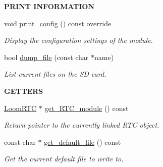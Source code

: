 \begin{Indent}{\bf P\+R\+I\+NT I\+N\+F\+O\+R\+M\+A\+T\+I\+ON}\par
\begin{DoxyCompactItemize}
\item 
void \hyperlink{class_loom___s_d_a4c0c3f46a3479ed8e4a96c0ca4acfa7e}{print\+\_\+config} () const override
\begin{DoxyCompactList}\small\item\em Display the configuration settings of the module. \end{DoxyCompactList}\item 
bool \hyperlink{class_loom___s_d_aeeb9d41ad9b91658af6295483b42c55a}{dump\+\_\+file} (const char $\ast$name)
\begin{DoxyCompactList}\small\item\em List current files on the SD card. \end{DoxyCompactList}\end{DoxyCompactItemize}
\end{Indent}
\begin{Indent}{\bf G\+E\+T\+T\+E\+RS}\par
\begin{DoxyCompactItemize}
\item 
\hyperlink{class_loom_r_t_c}{Loom\+R\+TC} $\ast$ \hyperlink{class_loom___s_d_a4092a0759777c669914942c3559e6a76}{get\+\_\+\+R\+T\+C\+\_\+module} () const 
\begin{DoxyCompactList}\small\item\em Return pointer to the currently linked R\+TC object. \end{DoxyCompactList}\item 
const char $\ast$ \hyperlink{class_loom___s_d_a5abc30ca684dbd2cedb0e18c3c8a9685}{get\+\_\+default\+\_\+file} () const 
\begin{DoxyCompactList}\small\item\em Get the current default file to write to. \end{DoxyCompactList}\end{DoxyCompactItemize}
\end{Indent}
